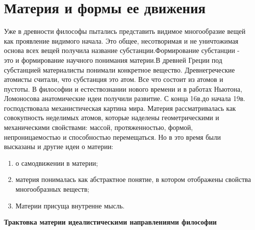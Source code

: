 \documentclass[12pt]{article}
\begin{document}
\newpage
\section{Материя и формы ее движения}
Уже в древности философы пытались представить  видимое многообразие вещей как проявление видимого
начала.  Это  общее,  несотворимая   и  не  уничтожимая  основа  всех  вещей  получила  название
субстанции.Формирование субстанции - это и формирование научного понимания материи.В древней Греции
под  субстанцией   материалисты  понимали  конкретное  вещество.  Древнегреческие  атомисты  считали,  что
субстанция это атом. Все что состоит из атомов и пустоты. В философии и естествознании нового времени и в
работах Ньютона, Ломоносова анатомические идеи получили развитие.
 С конца 16в.до начала 19в. господствовала механистическая картина мира. Материя рассматривалась  как
совокупность неделимых атомов, которые наделены геометрическими и механическими  свойствами: массой,
протяженностью, формой, непроницаемостью и способностью перемещаться.
Но в это время были высказаны и другие идеи о материи:
\begin{enumerate}
  \item о самодвижении в материи;
  \item материя понималась
как  абстрактное  понятие,  в  котором  отображены  свойства  многообразных   веществ;
\item  Материи  присуща
внутренне  мысль.
\end{enumerate}

\textbf{Трактовка  материи  идеалистическими  направлениями   философии}
\end{document}
